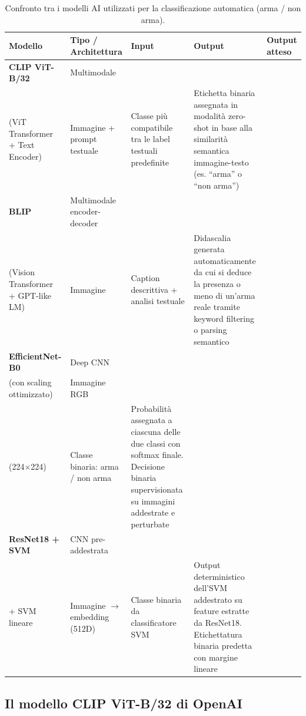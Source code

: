 \begin{table}[H]
  \centering
  \caption{Confronto tra i modelli AI utilizzati per la classificazione automatica (arma / non arma).}
  \label{tab:modelli-ai-confronto}
  \begin{tabularx}{\textwidth}{>{\raggedright\arraybackslash}p{3cm} >{\raggedright\arraybackslash}p{2.5cm} >{\raggedright\arraybackslash}p{2.5cm} >{\raggedright\arraybackslash}p{2.5cm} >{\raggedright\arraybackslash}X}
  \toprule
  \textbf{Modello} & \textbf{Tipo / Architettura} & \textbf{Input} & \textbf{Output} & \textbf{Output atteso} \\
  \midrule
  \textbf{CLIP ViT-B/32} & Multimodale \\ (ViT Transformer + Text Encoder) & Immagine + prompt testuale & Classe più compatibile tra le label testuali predefinite & Etichetta binaria assegnata in modalità zero-shot in base alla similarità semantica immagine-testo (es. ``arma'' o ``non arma'') \\
  \addlinespace
  \textbf{BLIP} & Multimodale encoder-decoder \\ (Vision Transformer + GPT-like LM) & Immagine & Caption descrittiva + analisi testuale & Didascalia generata automaticamente da cui si deduce la presenza o meno di un’arma reale tramite keyword filtering o parsing semantico \\
  \addlinespace
  \textbf{EfficientNet-B0} & Deep CNN \\ (con scaling ottimizzato) & Immagine RGB \\ (224$\times$224) & Classe binaria: arma / non arma & Probabilità assegnata a ciascuna delle due classi con softmax finale. Decisione binaria supervisionata su immagini addestrate e perturbate \\
  \addlinespace
  \textbf{ResNet18 + SVM} & CNN pre-addestrata \\ + SVM lineare & Immagine $\rightarrow$ embedding (512D) & Classe binaria da classificatore SVM & Output deterministico dell'SVM addestrato su feature estratte da ResNet18. Etichettatura binaria predetta con margine lineare \\
  \bottomrule
  \end{tabularx}
\end{table}



\subsection*{Il modello CLIP ViT-B/32 di OpenAI}
\label{sec:clip-model}

